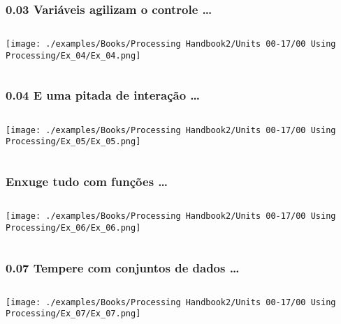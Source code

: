 \documentclass{beamer}
\begin{document}
\begin{frame}[fragile]
\frametitle{0.03 Variáveis agilizam o controle \dots}
  \begin{columns}[T]
    \begin{column}{.4\textwidth}
    \texttt{[image: ./examples/Books/Processing Handbook2/Units 00-17/00 Using Processing/Ex\_04/Ex\_04.png]}
    \end{column}
    \begin{column}{.6\textwidth}
      
    \end{column}
  \end{columns}
\end{frame}


\begin{frame}[fragile]
\frametitle{0.04 E uma pitada de interação \dots}
  \begin{columns}[T]
    \begin{column}{.4\textwidth}
    \texttt{[image: ./examples/Books/Processing Handbook2/Units 00-17/00 Using Processing/Ex\_05/Ex\_05.png]}
    \end{column}
    \begin{column}{.6\textwidth}
      
    \end{column}
  \end{columns}
\end{frame}

\begin{frame}[fragile]
\frametitle{Enxuge tudo com funções \dots}
  \begin{columns}[T]
    \begin{column}{.4\textwidth}
    \texttt{[image: ./examples/Books/Processing Handbook2/Units 00-17/00 Using Processing/Ex\_06/Ex\_06.png]}
    \end{column}
    \begin{column}{.6\textwidth}
      
    \end{column}
  \end{columns}
\end{frame}

\begin{frame}[fragile]
\frametitle{0.07 Tempere com conjuntos de dados \dots}
  \begin{columns}[T]
    \begin{column}{.4\textwidth}
    \texttt{[image: ./examples/Books/Processing Handbook2/Units 00-17/00 Using Processing/Ex\_07/Ex\_07.png]}
    \end{column}
    \begin{column}{.6\textwidth}
      
    \end{column}
  \end{columns}
\end{frame}
\end{document}
